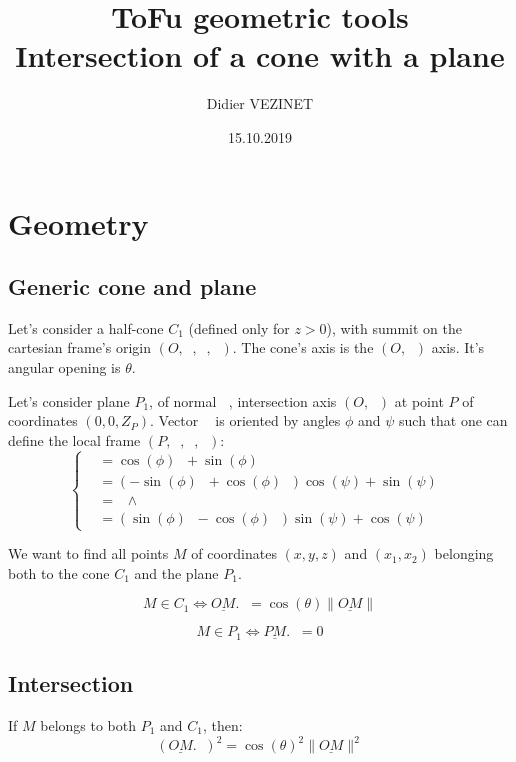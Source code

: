 \documentclass[a4paper,11pt,twoside,titlepage,openright]{book}
\numberwithin{equation}{section}
\newcommand{\lt}{\left}
\newcommand{\rt}{\right}
\DeclareMathOperator{\n}{\underline{n}}
\DeclareMathOperator{\ei}{\underline{e}_1}
\DeclareMathOperator{\et}{\underline{e}_2}
\DeclareMathOperator{\ex}{\underline{e}_x}
\DeclareMathOperator{\ey}{\underline{e}_y}
\DeclareMathOperator{\ez}{\underline{e}_z}
\newcommand{\wdg}{\wedge}
\begin{document}
\title{ToFu geometric tools\\ Intersection of a cone with a plane}
\author{Didier VEZINET}
\date{15.10.2019}
\maketitle

\tableofcontents

\chapter{Geometry}
\label{chap:Definitions}

\section{Generic cone and plane}

Let's consider a half-cone $C_1$ (defined only for $z > 0$), with summit on the cartesian frame's origin $(O, \ex, \ey, \ez)$.
The cone's axis is the $(O,\ez)$ axis.
It's angular opening is $\theta$.

Let's consider plane $P_1$, of normal $\n$, intersection axis $(O,\ez)$ at point $P$ of coordinates $(0,0,Z_P)$.
Vector $\n$ is oriented by angles $\phi$ and $\psi$ such that one can define the local frame $(P, \ei, \et, \n)$:
$$
\lt\{
	\begin{array}{ll}
		\ei & = \cos(\phi)\ex + \sin(\phi)\ey\\
		\et & = \lt(-\sin(\phi)\ex + \cos(\phi)\ey\rt)\cos(\psi) + \sin(\psi)\ez\\
		\n & = \ei \wdg \et\\
		   & = \lt( \sin(\phi)\ex - \cos(\phi)\ey \rt)\sin(\psi) + \cos(\psi)\ez
	\end{array}
\rt.
$$

We want to find all points $M$ of coordinates $(x, y, z)$ and $(x_1, x_2)$ belonging both to the cone $C_1$ and the plane $P_1$.

$$
M \in C_1 \Leftrightarrow \underline{OM}.\ez = \cos(\theta) \|\underline{OM}\|
$$

$$
M \in P_1 \Leftrightarrow \underline{PM}.\n = 0
$$


\section{Intersection}

If $M$ belongs to both $P_1$ and $C_1$, then:
$$
(\underline{OM}.\ez)^2 = \cos(\theta)^2 \|\underline{OM}\|^2
$$
\end{document}
